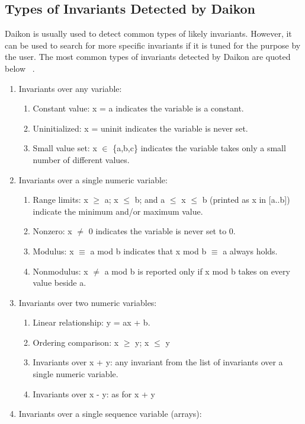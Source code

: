 \subsection{Types of Invariants Detected by Daikon}
Daikon is usually used to detect common types of likely invariants. However, it can be used to search for more specific invariants if it is tuned for the purpose by the user. The most common types of invariants detected by Daikon are quoted below ~\cite{ernst2001dynamically}. 
\begin{enumerate}
\item Invariants over any variable: 
	\begin{enumerate}
	 \item Constant value: x = a indicates the variable is a constant.
	 \item Uninitialized: x = uninit indicates the variable is never set.
	 \item Small value set: x $\in$ \{a,b,c\} indicates the variable takes only a small number of different values.
	\end{enumerate}
\item Invariants over a single numeric variable: 
	\begin{enumerate}
	\item Range limits: x $\ge$ a; x $\le$ b; and a $\le$ x $\le$ b (printed as x in [a..b]) indicate the minimum and/or maximum value.
	\item Nonzero: x $\ne$ 0 indicates the variable is never set to 0. 
	\item Modulus: x $\equiv$ a mod b indicates that x mod b $\equiv$ a always holds.
	\item Nonmodulus: x $\ne$ a mod b is reported only if x mod b takes on every value beside a.
	\end{enumerate}
\item Invariants over two numeric variables: 
	\begin{enumerate}
	\item Linear relationship: y = ax + b. 
	\item Ordering comparison:  x $\ge$ y; x $\le$ y
	\item Invariants over x + y: any invariant from the list of invariants over a single numeric variable.
	\item Invariants over x - y: as for x + y
	\end{enumerate}
\item Invariants over a single sequence variable (arrays): 
	\begin{enumerate}

\end{enumerate}
\end{enumerate}
